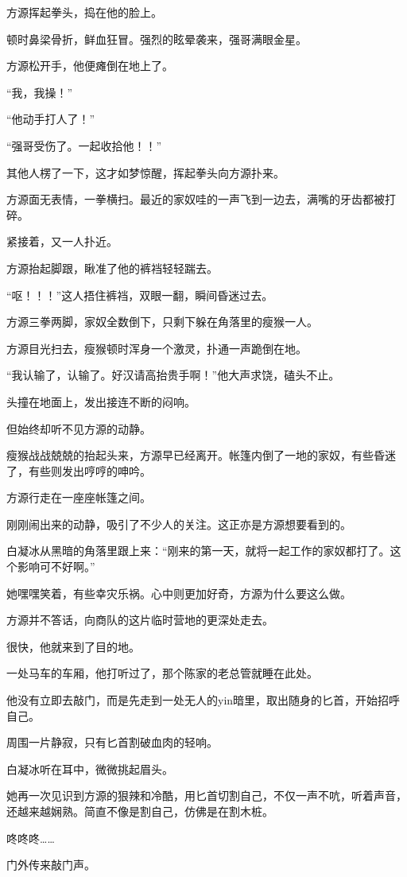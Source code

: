 \begin{this_body}
方源挥起拳头，捣在他的脸上。

顿时鼻梁骨折，鲜血狂冒。强烈的眩晕袭来，强哥满眼金星。

方源松开手，他便瘫倒在地上了。

“我，我操！”

“他动手打人了！”

“强哥受伤了。一起收拾他！！”

其他人楞了一下，这才如梦惊醒，挥起拳头向方源扑来。

方源面无表情，一拳横扫。最近的家奴哇的一声飞到一边去，满嘴的牙齿都被打碎。

紧接着，又一人扑近。

方源抬起脚跟，瞅准了他的裤裆轻轻踹去。

“呕！！！”这人捂住裤裆，双眼一翻，瞬间昏迷过去。

方源三拳两脚，家奴全数倒下，只剩下躲在角落里的瘦猴一人。

方源目光扫去，瘦猴顿时浑身一个激灵，扑通一声跪倒在地。

“我认输了，认输了。好汉请高抬贵手啊！”他大声求饶，磕头不止。

头撞在地面上，发出接连不断的闷响。

但始终却听不见方源的动静。

瘦猴战战兢兢的抬起头来，方源早已经离开。帐篷内倒了一地的家奴，有些昏迷了，有些则发出哼哼的呻吟。

方源行走在一座座帐篷之间。

刚刚闹出来的动静，吸引了不少人的关注。这正亦是方源想要看到的。

白凝冰从黑暗的角落里跟上来：“刚来的第一天，就将一起工作的家奴都打了。这个影响可不好啊。”

她嘿嘿笑着，有些幸灾乐祸。心中则更加好奇，方源为什么要这么做。

方源并不答话，向商队的这片临时营地的更深处走去。

很快，他就来到了目的地。

一处马车的车厢，他打听过了，那个陈家的老总管就睡在此处。

他没有立即去敲门，而是先走到一处无人的yin暗里，取出随身的匕首，开始招呼自己。

周围一片静寂，只有匕首割破血肉的轻响。

白凝冰听在耳中，微微挑起眉头。

她再一次见识到方源的狠辣和冷酷，用匕首切割自己，不仅一声不吭，听着声音，还越来越娴熟。简直不像是割自己，仿佛是在割木桩。

咚咚咚……

门外传来敲门声。


\end{this_body}
